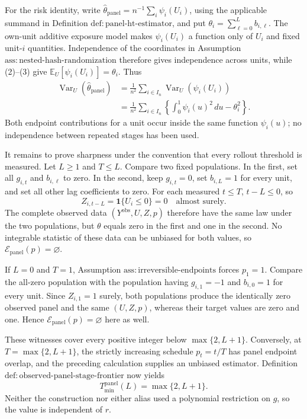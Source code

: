 For the risk identity, write \(\widehat\theta_{\mathrm{panel}}=n^{-1}\sum_i\psi_i(U_i)\), using the applicable summand in Definition \(\mathrm{def:panel\text{-}ht\text{-}estimator}\), and put \(\theta_i=\sum_{\ell=0}^{L}b_{i,\ell}\).  The own-unit additive exposure model makes \(\psi_i(U_i)\) a function only of \(U_i\) and fixed unit-\(i\) quantities.  Independence of the coordinates in Assumption \(\mathrm{ass:nested\text{-}hash\text{-}randomization}\) therefore gives independence across units, while (2)--(3) give \(\mathbb E_U[\psi_i(U_i)]=\theta_i\).  Thus
\[
\begin{aligned}
 \operatorname{Var}_U(\widehat\theta_{\mathrm{panel}})
 &=\frac1{n^2}\sum_{i\in I_n}\operatorname{Var}_U(\psi_i(U_i))\\
 &=\frac1{n^2}\sum_{i\in I_n}
 \left\{\int_0^1\psi_i(u)^2\,du-\theta_i^2\right\}.
\end{aligned}
\]
Both endpoint contributions for a unit occur inside the same function \(\psi_i(u)\); no independence between repeated stages has been used.

It remains to prove sharpness under the convention that every rollout threshold is measured.  Let \(L\geq1\) and \(T\leq L\).  Compare two fixed populations.  In the first, set all \(g_{i,t}\) and \(b_{i,\ell}\) to zero.  In the second, keep \(g_{i,t}=0\), set \(b_{i,L}=1\) for every unit, and set all other lag coefficients to zero.  For each measured \(t\leq T\), \(t-L\leq0\), so
\[
 Z_{i,t-L}=\mathbf 1\{U_i\leq0\}=0
 \quad\text{almost surely}.
\]
The complete observed data \((Y^{\mathrm{obs}},U,Z,p)\) therefore have the same law under the two populations, but \(\theta\) equals zero in the first and one in the second.  No integrable statistic of these data can be unbiased for both values, so \(\mathcal E_{\mathrm{panel}}(p)=\varnothing\).

If \(L=0\) and \(T=1\), Assumption \(\mathrm{ass:irreversible\text{-}endpoints}\) forces \(p_1=1\).  Compare the all-zero population with the population having \(g_{i,1}=-1\) and \(b_{i,0}=1\) for every unit.  Since \(Z_{i,1}=1\) surely, both populations produce the identically zero observed panel and the same \((U,Z,p)\), whereas their target values are zero and one.  Hence \(\mathcal E_{\mathrm{panel}}(p)=\varnothing\) here as well.

These witnesses cover every positive integer below \(\max\{2,L+1\}\).  Conversely, at \(T=\max\{2,L+1\}\), the strictly increasing schedule \(p_t=t/T\) has panel endpoint overlap, and the preceding calculation supplies an unbiased estimator.  Definition \(\mathrm{def:observed\text{-}panel\text{-}stage\text{-}frontier}\) now yields
\[
 T_{\min}^{\mathrm{panel}}(L)=\max\{2,L+1\}.
\]
Neither the construction nor either alias used a polynomial restriction on \(g\), so the value is independent of \(r\).